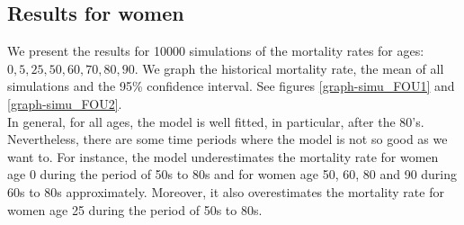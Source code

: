 \documentclass[smallextended]{svjour3}
\begin{document}
\subsection{Results for women}\label{re-wom}

We present the results for 10000 simulations of the mortality rates for ages:
$0,5,25,50,60,70,80,90$.
We graph the historical mortality rate, the mean of all simulations and the
95\% confidence interval. See figures \ref{graph-simu_FOU1} and
\ref{graph-simu_FOU2}.\\

In general, for all ages, the model is well fitted, in particular, after the
80's. Nevertheless, there are some time periods where the model is not
so good as we want to. For instance, the model underestimates the mortality
rate for women age 0 during the period of 50s to 80s and for women age 50, 60,
80 and 90 during
60s to 80s approximately. Moreover, it also overestimates the mortality rate for
women age 25 during the period of 50s to 80s.
\end{document}
